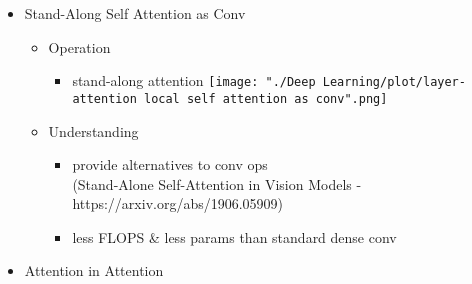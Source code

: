 \begin{itemize}
\item Stand-Along Self Attention as Conv
	\begin{itemize}
	\item Operation
		\begin{itemize}
		\item stand-along attention
		\texttt{[image: "./Deep Learning/plot/layer-attention local self attention as conv".png]}
		\end{itemize}
	\item Understanding
		\begin{itemize}
		\item provide alternatives to conv ops \\
		(Stand-Alone Self-Attention in Vision Models - https://arxiv.org/abs/1906.05909)
		\item less FLOPS \& less params than standard dense conv
		\end{itemize}
	\end{itemize}

\item Attention in Attention


\end{itemize}
